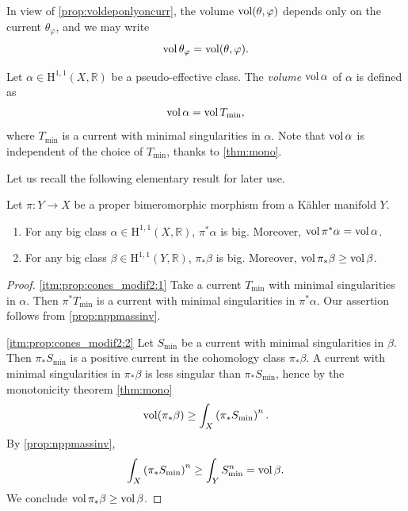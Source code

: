 In view of \cref{prop:voldeponlyoncurr}, the volume $\operatorname{vol}(\theta,\varphi)$ depends only on the current $\theta_{\varphi}$, and we may write
\begin{equation}\label{eq:volcurrdef}
    \operatorname{vol} \theta_{\varphi}=\operatorname{vol}(\theta,\varphi).
\end{equation}
\index{$\vol \theta_{\varphi}$}

\begin{definition}\label{def:volcohclass}
    Let $\alpha\in \mathrm{H}^{1,1}(X,\mathbb{R})$ be a pseudo-effective class. The \emph{volume} $\operatorname{vol} \alpha$ of $\alpha$ is defined as
    \[
    \operatorname{vol} \alpha=\operatorname{vol} T_{\min},
    \]
    where $T_{\min}$ is a current with minimal singularities in $\alpha$. Note that $\operatorname{vol} \alpha$ is independent of the choice of $T_{\min}$, thanks to \cref{thm:mono}.
\end{definition}

Let us recall the following elementary result for later use.
\begin{proposition}\label{prop:cones_modif2}
    Let $\pi\colon Y\rightarrow X$ be a proper bimeromorphic morphism from a Kähler manifold $Y$.
    \begin{enumerate}
        \item\label{itm:prop:cones_modif2:1} For any big class $\alpha\in \mathrm{H}^{1,1}(X,\mathbb{R})$, $\pi^*\alpha$ is big. Moreover, $\operatorname{vol} \pi^*\alpha=\operatorname{vol} \alpha$.
        \item\label{itm:prop:cones_modif2:2} For any big class $\beta\in \mathrm{H}^{1,1}(Y,\mathbb{R})$, $\pi_*\beta$ is big. Moreover, $\operatorname{vol} \pi_*\beta\geq \operatorname{vol} \beta$.
    \end{enumerate}
\end{proposition}
\begin{proof}
    \ref{itm:prop:cones_modif2:1} Take a current $T_{\min}$ with minimal singularities in $\alpha$. Then $\pi^*T_{\min}$ is a current with minimal singularities in $\pi^*\alpha$. Our assertion follows from \cref{prop:nppmassinv}.

    \ref{itm:prop:cones_modif2:2} Let $S_{\min}$ be a current with minimal singularities in $\beta$. Then $\pi_*S_{\min}$ is a positive current in the cohomology class $\pi_*\beta$. A current with minimal singularities in $\pi_*\beta$ is less singular than $\pi_*S_{\min}$, hence by the monotonicity theorem \cref{thm:mono}
    \[
        \operatorname{vol}(\pi_*\beta)\geq \int_X\left(\pi_*S_{\min}\right)^n.
    \]
    By \cref{prop:nppmassinv},
    \[
        \int_X \left(\pi_*S_{\min}\right)^n\geq \int_Y S_{\min}^n=\operatorname{vol}\beta.
    \]
    We conclude $\operatorname{vol} \pi_*\beta\geq \operatorname{vol} \beta$.
\end{proof}


